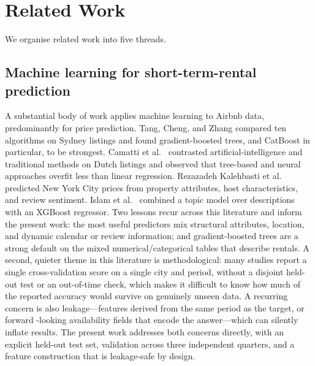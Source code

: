 \documentclass[review,12pt]{elsarticle}
\begin{document}
\section{Related Work}
\label{sec:related}
We organise related work into five threads.

\subsection{Machine learning for short-term-rental prediction}
A substantial body of work applies machine learning to Airbnb data, predominantly
for price prediction. Tang, Cheng, and Zhang \citeyearpar{tang2024} compared ten
algorithms on Sydney listings and found gradient-boosted trees, and CatBoost in
particular, to be strongest. Camatti et al.\ \citeyearpar{camatti2024} contrasted
artificial-intelligence and traditional methods on Dutch listings and observed
that tree-based and neural approaches overfit less than linear regression.
Rezazadeh Kalehbasti et al.\ \citeyearpar{kalehbasti2019} predicted New York City prices
from property attributes, host characteristics, and review sentiment. Islam et
al.\ \citeyearpar{islam2022} combined a topic model over descriptions with an XGBoost
regressor. Two lessons recur across this literature and inform the present work:
the most useful predictors mix structural attributes, location, and dynamic
calendar or review information; and gradient-boosted trees are a strong default on
the mixed numerical/categorical tables that describe rentals. A second, quieter
theme in this literature is methodological: many studies report a single
cross-validation score on a single city and period, without a disjoint held-out
test or an out-of-time check, which makes it difficult to know how much of the
reported accuracy would survive on genuinely unseen data. A recurring concern is
also leakage---features derived from the same period as the target, or forward
-looking availability fields that encode the answer---which can silently inflate
results. The present work addresses both concerns directly, with an explicit
held-out test set, validation across three independent quarters, and a feature
construction that is leakage-safe by design.
\end{document}
